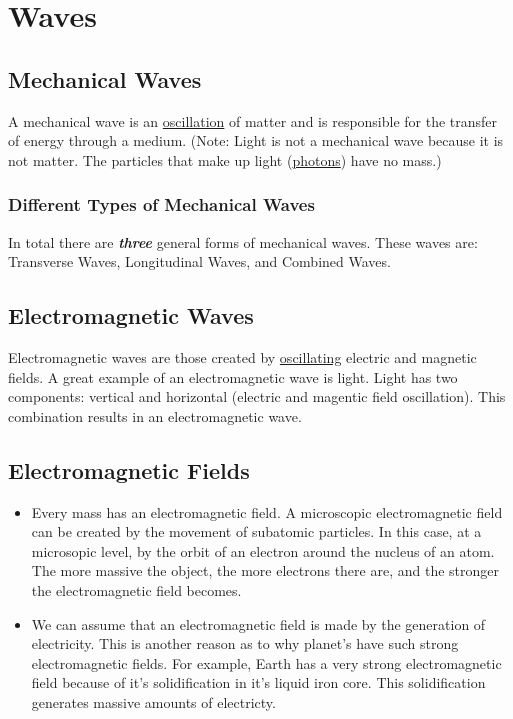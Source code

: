 \documentclass{article}
\begin{document}
\section{Waves}
\subsection{Mechanical Waves}
A mechanical wave is an \hyperref[sec:oscillation]{oscillation} of matter and is responsible for the transfer of energy through a medium. (Note: Light is not a mechanical wave because it is not matter. The particles that make up light (\hyperref[sec:photons]{photons}) have no mass.)
\subsubsection{Different Types of Mechanical Waves}
In total there are \textbf{\textit{three}} general forms of mechanical waves. These waves are: Transverse Waves, Longitudinal Waves, and Combined Waves.
\subsection{Electromagnetic Waves}
Electromagnetic waves are those created by \hyperref[sec:oscillation]{oscillating} electric and magnetic fields. A great example of an electromagnetic wave is light. Light has two components: vertical and horizontal (electric and magentic field oscillation). This combination results in an electromagnetic wave.
\subsection{Electromagnetic Fields}\label{sec:electromagneticfields}
\begin{itemize}
    \item Every mass has an electromagnetic field. A microscopic electromagnetic field can be created by the movement of subatomic particles. In this case, at a microsopic level, by the orbit of an electron around the nucleus of an atom. The more massive the object, the more electrons there are, and the stronger the electromagnetic field becomes.
    \item We can assume that an electromagnetic field is made by the generation of electricity. This is another reason as to why planet's have such strong electromagnetic fields. For example, Earth has a very strong electromagnetic field because of it's solidification in it's liquid iron core. This solidification generates massive amounts of electricty.
\end{itemize}
\end{document}
